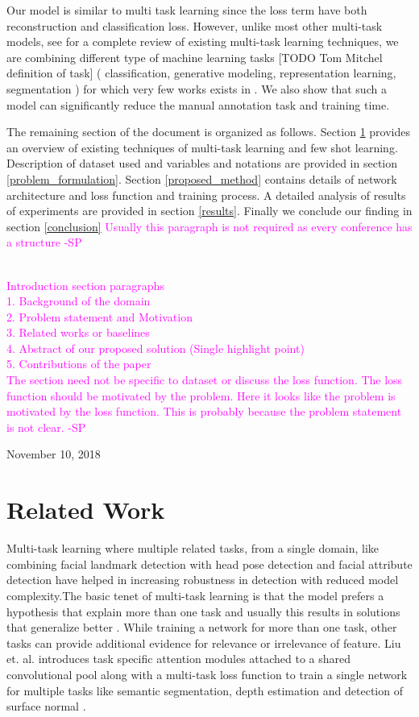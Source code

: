 \documentclass[journal]{IEEEtran}
\newcommand{\snote}[1]{\textcolor{magenta}{#1 -SP}}
\begin{document}
Our model is similar to multi task learning since the loss term have both reconstruction and classification loss. However, unlike most other multi-task models, see \cite{mtl_2017_ruder} \cite{mtl_2020_michael} for a complete review of existing multi-task learning techniques, we are combining  different type of machine learning tasks [TODO Tom Mitchel definition of task] ( classification, generative modeling, representation learning, segmentation )  for which very few works exists in \cite{laddernetwork}. We also show that such a model can significantly reduce the manual annotation task and training time.

The remaining section of the document is organized as follows. Section \ref{related_works} provides an overview of existing techniques of multi-task learning and few shot learning. Description of dataset used and variables and notations are provided in section \ref{problem_formulation}. Section \ref{proposed_method} contains details of network architecture and loss function and training process. A detailed analysis of results of experiments are provided in section \ref{results}. Finally we conclude our finding in section \ref{conclusion} \snote{Usually this paragraph is not required as every conference has a structure}

\snote{\\
Introduction section paragraphs\\
1. Background of the domain\\
2. Problem statement and Motivation\\
3. Related works or baselines\\
4. Abstract of our proposed solution (Single highlight point)\\
5. Contributions of the paper\\
The section need not be specific to dataset or discuss the loss function. The loss function should be motivated by the problem. Here it looks like the problem is motivated by the loss function. This is probably because the problem statement is not clear.
}

 
\hfill November  10, 2018

\section{Related Work} \label{related_works}
Multi-task learning where multiple related tasks, from a single domain, like combining facial landmark detection with head pose detection and facial attribute detection \cite{mtl_zhang_2014} have helped in increasing robustness in detection with reduced model complexity.The basic tenet of multi-task learning is that the model prefers a hypothesis that explain more than one task and usually this results in solutions that generalize better \cite{mtl_2017_ruder}. While training a network for more than one task, other tasks can provide additional evidence for relevance or irrelevance of feature. Liu et. al. introduces task specific attention modules attached to a shared convolutional pool  along with a multi-task loss function to train a single network for multiple tasks like semantic segmentation, depth estimation and detection of surface normal \cite{mtl_liu_2019}.
\end{document}
